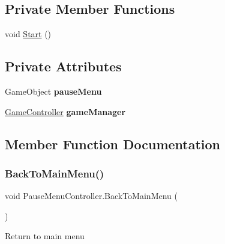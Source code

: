 \subsection*{Private Member Functions}
\begin{DoxyCompactItemize}
\item 
void \mbox{\hyperlink{class_pause_menu_controller_ad206f4e82b3550eb9a4c22e0a5320126}{Start}} ()
\end{DoxyCompactItemize}
\subsection*{Private Attributes}
\begin{DoxyCompactItemize}
\item 
\mbox{\label{class_pause_menu_controller_a6a7477e6be0a8e0179d97bcd074a1dec}} 
Game\+Object {\bfseries pause\+Menu}
\item 
\mbox{\label{class_pause_menu_controller_ae564c2b7219be5766427da0887433216}} 
\mbox{\hyperlink{class_game_controller}{Game\+Controller}} {\bfseries game\+Manager}
\end{DoxyCompactItemize}


\subsection{Member Function Documentation}
\mbox{\label{class_pause_menu_controller_afaeaff398ebcdab19e5eb124f8084764}} 
\subsubsection{\texorpdfstring{Back\+To\+Main\+Menu()}{BackToMainMenu()}}
{\footnotesize\ttfamily void Pause\+Menu\+Controller.\+Back\+To\+Main\+Menu (\begin{DoxyParamCaption}{ }\end{DoxyParamCaption})}

Return to main menu \mbox{\label{class_pause_menu_controller_a593d9304ba80dcc10449b5e9d612b67c}} 
